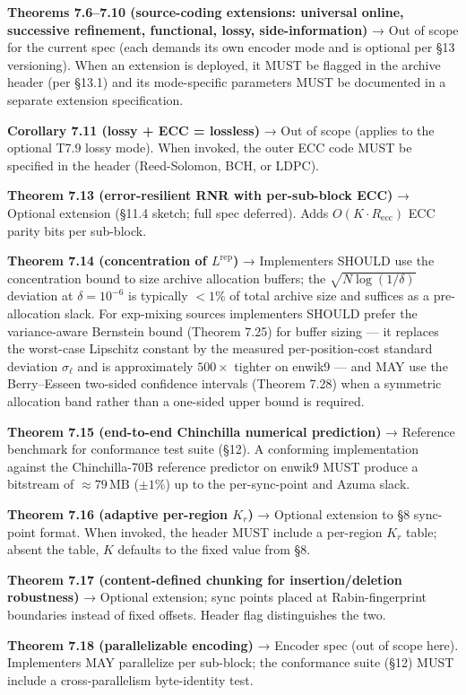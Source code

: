 \documentclass[
]{article}
\begin{document}
\textbf{Theorems 7.6--7.10 (source-coding extensions: universal
online, successive refinement, functional, lossy, side-information)}
→ Out of scope for the current spec (each demands its own encoder
mode and is optional per §13 versioning). When an extension is
deployed, it MUST be flagged in the archive header (per §13.1) and
its mode-specific parameters MUST be documented in a separate
extension specification.

\textbf{Corollary 7.11 (lossy + ECC = lossless)} → Out of scope
(applies to the optional T7.9 lossy mode). When invoked, the outer
ECC code MUST be specified in the header (Reed-Solomon, BCH, or
LDPC).

\textbf{Theorem 7.13 (error-resilient RNR with per-sub-block ECC)} →
Optional extension (§11.4 sketch; full spec deferred). Adds
$O(K \cdot R_{\mathrm{ecc}})$ ECC parity bits per sub-block.

\textbf{Theorem 7.14 (concentration of $L^{\mathrm{rep}}$)} →
Implementers SHOULD use the concentration bound to size archive
allocation buffers; the $\sqrt{N \log(1/\delta)}$ deviation at
$\delta = 10^{-6}$ is typically $< 1\%$ of total archive size and
suffices as a pre-allocation slack. For exp-mixing sources
implementers SHOULD prefer the variance-aware Bernstein bound
(Theorem 7.25) for buffer sizing --- it replaces the worst-case
Lipschitz constant by the measured per-position-cost standard
deviation $\sigma_\ell$ and is approximately $500\times$ tighter on
enwik9 --- and MAY use the Berry--Esseen two-sided confidence
intervals (Theorem 7.28) when a symmetric allocation band rather than
a one-sided upper bound is required.

\textbf{Theorem 7.15 (end-to-end Chinchilla numerical prediction)}
→ Reference benchmark for conformance test suite (§12). A
conforming implementation against the Chinchilla-70B reference
predictor on enwik9 MUST produce a bitstream of $\approx 79\,\mathrm{MB}$
($\pm 1\%$) up to the per-sync-point and Azuma slack.

\textbf{Theorem 7.16 (adaptive per-region $K_r$)} → Optional
extension to §8 sync-point format. When invoked, the header MUST
include a per-region $K_r$ table; absent the table, $K$ defaults
to the fixed value from §8.

\textbf{Theorem 7.17 (content-defined chunking for insertion/deletion
robustness)} → Optional extension; sync points placed at
Rabin-fingerprint boundaries instead of fixed offsets. Header flag
distinguishes the two.

\textbf{Theorem 7.18 (parallelizable encoding)} → Encoder spec
(out of scope here). Implementers MAY parallelize per sub-block;
the conformance suite (§12) MUST include a cross-parallelism
byte-identity test.
\end{document}
